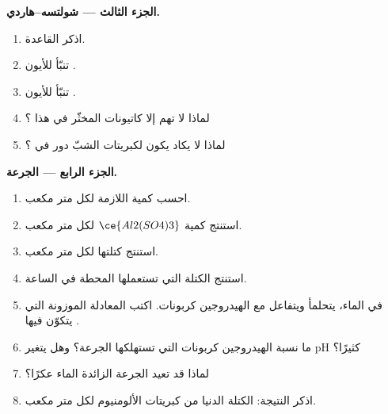 \begin{problem}
\medskip\noindent\textbf{الجزء الثالث --- شولتسه--هاردي.}
\begin{enumerate}[resume]
  \item اذكر القاعدة.
  \item تنبّأ  للأيون .
  \item تنبّأ  للأيون .
  \item لماذا لا تهم إلا كاتيونات المخثّر في هذا ؟
  \item لماذا لا يكاد يكون لكبريتات الشبّ دور في ؟
\end{enumerate}

\medskip\noindent\textbf{الجزء الرابع --- الجرعة.}
\begin{enumerate}[resume]
  \item احسب كمية  اللازمة لكل متر مكعب.
  \item استنتج كمية $\ce{Al2(SO4)3}$ لكل متر مكعب.
  \item استنتج كتلتها لكل متر مكعب.
  \item استنتج الكتلة التي تستعملها المحطة في الساعة.
  \item في الماء، يتحلمأ  ويتفاعل مع الهيدروجين كربونات. اكتب
        المعادلة الموزونة التي يتكوّن فيها .
  \item ما نسبة الهيدروجين كربونات التي تستهلكها الجرعة؟ وهل يتغير
        pH كثيرًا؟
  \item لماذا قد تعيد الجرعة الزائدة الماء عكرًا؟
  \item اذكر النتيجة: الكتلة الدنيا من كبريتات الألومنيوم لكل متر مكعب.
\end{enumerate}
\end{problem}
